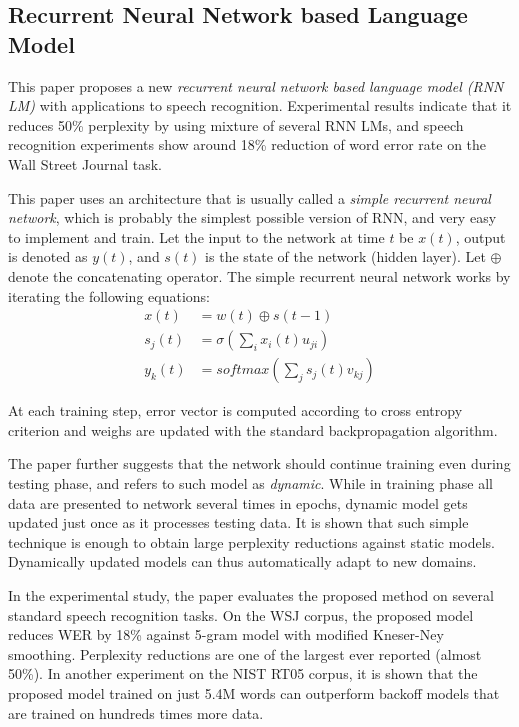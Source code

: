 \subsection{Recurrent Neural Network based Language Model \cite{Mikolov2010}}

This paper proposes a new \emph{recurrent neural network based language model (RNN LM)} with applications to speech recognition. Experimental results indicate that it reduces 50\% perplexity by using mixture of several RNN LMs, and speech recognition experiments show around 18\% reduction of word error rate on the Wall Street Journal task.

This paper uses an architecture that is usually called a \emph{simple recurrent neural network}, which is probably the simplest possible version of RNN, and very easy to implement and train. Let the input to the network at time $t$ be $x(t)$, output is denoted as $y(t)$, and $s(t)$ is the state of the network (hidden layer). Let $\oplus$ denote the concatenating operator. The simple recurrent neural network works by iterating the following equations:
\begin{align*}
x(t) &= w(t) \oplus s(t-1)\\
s_j(t) &= \sigma(\sum_i x_i(t) u_{ji})\\
y_k(t) &= softmax(\sum_j s_j(t) v_{kj})
\end{align*}

At each training step, error vector is computed according to cross entropy criterion and weighs are updated with the standard backpropagation algorithm.

The paper further suggests that the network should continue training even during testing phase, and refers to such model as \emph{dynamic}. While in training phase all data are presented to network several times in epochs, dynamic model gets updated just once as it processes testing data. It is shown that such simple technique is enough to obtain large perplexity reductions against static models. Dynamically updated models can thus automatically adapt to new domains.

In the experimental study, the paper evaluates the proposed method on several standard speech recognition tasks. On the WSJ corpus, the proposed model reduces WER by 18\% against 5-gram model with modified Kneser-Ney smoothing. Perplexity reductions are one of the largest ever reported (almost 50\%). In another experiment on the NIST RT05 corpus, it is shown that the proposed model trained on just 5.4M words can outperform backoff models that are trained on hundreds times more data.
